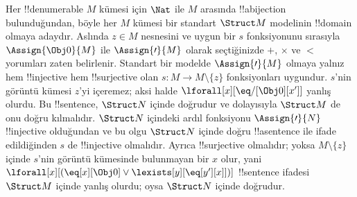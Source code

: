 \begin{explain}
Her !!{denumerable} $M$ kümesi için $\Nat$ ile $M$ arasında
!!a{bijection} bulunduğundan, böyle her $M$ kümesi bir standart
$\Struct M$ modelinin !!{domain} olmaya adaydır. Aslında
$z\in M$ nesnesini ve uygun bir $s$ fonksiyonunu sırasıyla
$\Assign{\Obj0}{M}$ ile $\Assign{\prime}{M}$ olarak seçtiğinizde
$+$, $\times$ ve $<$ yorumları zaten belirlenir. Standart bir modelde
$\Assign{\prime}{M}$ olmaya yalnız hem !!{injective} hem !!{surjective}
olan $s\colon M\to M\setminus\{z\}$ fonksiyonları uygundur. $s$'nin
görüntü kümesi $z$'yi içeremez; aksi halde
$\lforall[x][\eq/[\Obj0][x']]$ yanlış olurdu. Bu !!{sentence},
$\Struct N$ içinde doğrudur ve dolayısıyla $\Struct M$ de onu doğru
kılmalıdır. $\Struct N$ içindeki ardıl fonksiyonu
$\Assign{\prime}{N}$ !!{injective} olduğundan ve bu olgu $\Struct N$
içinde doğru !!a{sentence} ile ifade edildiğinden $s$ de !!{injective}
olmalıdır. Ayrıca !!{surjective} olmalıdır; yoksa
$M\setminus\{z\}$ içinde $s$'nin görüntü kümesinde bulunmayan bir $x$
olur, yani $\lforall[x][(\eq[x][\Obj0]\lor
\lexists[y][\eq[y'][x]])]$ !!{sentence} ifadesi $\Struct M$ içinde
yanlış olurdu; oysa $\Struct N$ içinde doğrudur.
\end{explain}

